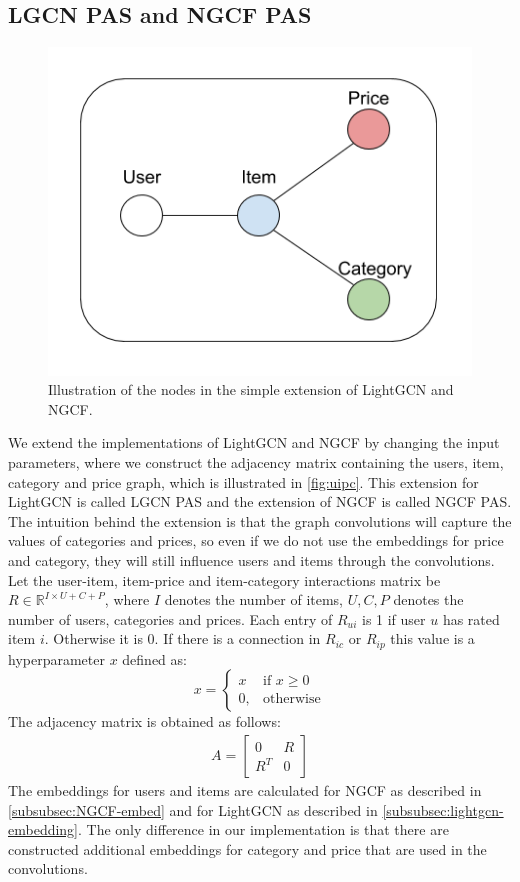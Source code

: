 \subsection{LGCN PAS and NGCF PAS}\label{subsec:simple-extension}
\begin{figure}
    \centering
    \includegraphics[scale=0.5]{figures/uipc.png}
    \caption{Illustration of the nodes in the simple extension of LightGCN and NGCF.}
    \label{fig:uipc}
\end{figure}
We extend the implementations of LightGCN and NGCF by changing the input parameters, where we construct the adjacency matrix containing the users, item, category and price graph, which is illustrated in \autoref{fig:uipc}.
This extension for LightGCN is called LGCN PAS and the extension of NGCF is called NGCF PAS.
The intuition behind the extension is that the graph convolutions will capture the values of categories and prices, so even if we do not use the embeddings for price and category, they will still influence users and items through the convolutions.
Let the user-item, item-price and item-category interactions matrix be $R \in \mathbb{R}^{I \times U + C + P}$, where $I$ denotes the number of items, $U, C, P$ denotes the number of users, categories and prices.
Each entry of $R_{ui}$ is 1 if user $u$ has rated item $i$. Otherwise it is 0.
If there is a connection in $R_{ic}$ or $R_{ip}$ this value is a hyperparameter $x$ defined as:
\[
    x= 
\begin{cases}
    x  & \text{if } x \geq 0\\
    0, & \text{otherwise}
\end{cases}
\]
The adjacency matrix is obtained as follows:
\begin{gather}
    A =
    \begin{bmatrix}
        0   & R \\
        R^T & 0
    \end{bmatrix}
\end{gather}
The embeddings for users and items are calculated for NGCF as described in \autoref{subsubsec:NGCF-embed} and for LightGCN as described in \autoref{subsubsec:lightgcn-embedding}.
The only difference in our implementation is that there are constructed additional embeddings for category and price that are used in the convolutions.
